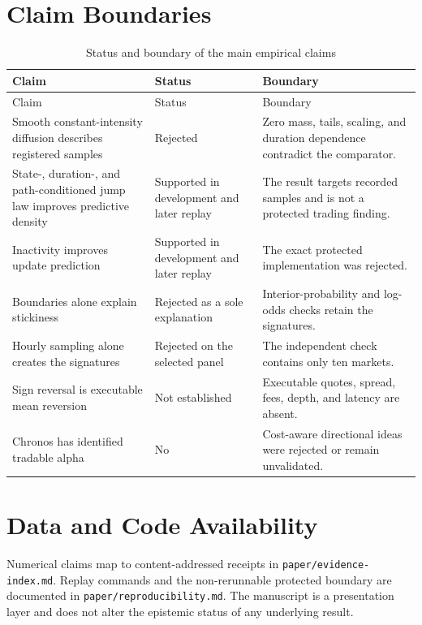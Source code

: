\documentclass[11pt]{article}
\begin{document}
\section{Claim Boundaries}

\begin{longtable}{P{0.30\textwidth}P{0.19\textwidth}P{0.29\textwidth}}
\caption{Status and boundary of the main empirical claims}\label{tab:claims}\\
\toprule
Claim & Status & Boundary \\
\midrule
\endfirsthead
\toprule
Claim & Status & Boundary \\
\midrule
\endhead
Smooth constant-intensity diffusion describes registered samples & Rejected & Zero mass, tails, scaling, and duration dependence contradict the comparator. \\
State-, duration-, and path-conditioned jump law improves predictive density & Supported in development and later replay & The result targets recorded samples and is not a protected trading finding. \\
Inactivity improves update prediction & Supported in development and later replay & The exact protected implementation was rejected. \\
Boundaries alone explain stickiness & Rejected as a sole explanation & Interior-probability and log-odds checks retain the signatures. \\
Hourly sampling alone creates the signatures & Rejected on the selected panel & The independent check contains only ten markets. \\
Sign reversal is executable mean reversion & Not established & Executable quotes, spread, fees, depth, and latency are absent. \\
Chronos has identified tradable alpha & No & Cost-aware directional ideas were rejected or remain unvalidated. \\
\bottomrule
\end{longtable}

\section*{Data and Code Availability}
Numerical claims map to content-addressed receipts in
\nolinkurl{paper/evidence-index.md}. Replay commands and the non-rerunnable protected boundary are
documented in \nolinkurl{paper/reproducibility.md}. The manuscript is a presentation layer and does
not alter the epistemic status of any underlying result.
\end{document}
